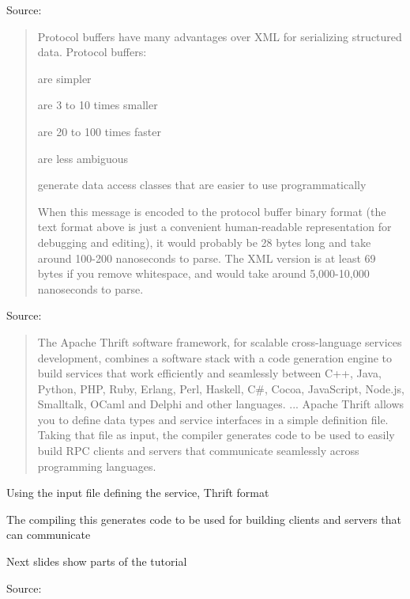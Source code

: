\documentclass[Screen16to9,17pt]{foils}
\begin{document}
Source:  {\footnotesize\\}



\begin{quote}
Protocol buffers have many advantages over XML for serializing structured data. Protocol buffers:

\begin{list2}
\item are simpler
\item are 3 to 10 times smaller
\item are 20 to 100 times faster
\item are less ambiguous
\item generate data access classes that are easier to use programmatically
\end{list2}

When this message is encoded to the protocol buffer binary format (the text format above is just a convenient human-readable representation for debugging and editing), it would probably be 28 bytes long and take around 100-200 nanoseconds to parse. The XML version is at least 69 bytes if you remove whitespace, and would take around 5,000-10,000 nanoseconds to parse.
\end{quote}
Source:  {\footnotesize\\}



\begin{quote}
  The Apache Thrift software framework, for scalable cross-language services development, combines a software stack with a code generation engine to build services that work efficiently and seamlessly between C++, Java, Python, PHP, Ruby, Erlang, Perl, Haskell, C\#, Cocoa, JavaScript, Node.js, Smalltalk, OCaml and Delphi and other languages.
...
Apache Thrift allows you to define data types and service interfaces in a simple definition file. Taking that file as input, the compiler generates code to be used to easily build RPC clients and servers that communicate seamlessly across programming languages.
\end{quote}

\begin{list2}
\item Using the input file defining the service, Thrift format
\item The compiling this generates code to be used for building clients and servers that can communicate
\item Next slides show parts of the tutorial 
\end{list2}
Source: {\footnotesize\\
}
\end{document}
